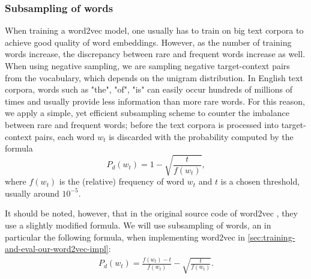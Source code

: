 \subsubsection{Subsampling of words}
When training a word2vec model, one usually has to train on big text corpora to achieve good quality of word embeddings. However, as the number of training words increase, the discrepancy between rare and frequent words increase as well. When using negative sampling, we are sampling negative target-context pairs from the vocabulary, which depends on the unigram distribution. In English text corpora, words such as "the", "of", "is" can easily occur hundreds of millions of times and usually provide less information than more rare words. For this reason, we apply a simple, yet efficient subsampling scheme to counter the imbalance between rare and frequent words; before the text corpora is processed into target-context pairs, each word $w_t$ is discarded with the probability computed by the formula \cite{mikolov2013b, levy-etal-2015-improving}
\begin{equation}
    P_d(w_t) = 1 - \sqrt{\frac{t}{f(w_t)}},
\end{equation}
where $f(w_t)$ is the (relative) frequency of word $w_t$ and $t$ is a chosen threshold, usually around $10^{-5}$.

It should be noted, however, that in the original source code of word2vec \cite[line 407]{Word2vecCCode}, they use a slightly modified formula. We will use subsampling of words, an in particular the following formula, when implementing word2vec in \cref{sec:training-and-eval-our-word2vec-impl}:
\begin{align}
    P_d(w_t) = \frac{f(w_t) - t}{f(w_t)} - \sqrt{\frac{t}{f(w_t)}}.
\end{align}

